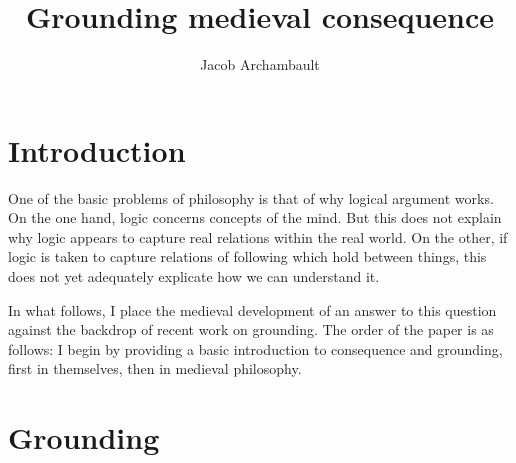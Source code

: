 \documentclass[a4paper,11pt]{article}
\title{Grounding medieval consequence}
\author{Jacob Archambault}
\begin{document}
\maketitle
\tableofcontents

\begin{abstract}
\end{abstract}

\section{Introduction}
One of the basic problems of philosophy is that of why logical argument works. On the one hand, logic concerns concepts of the mind. But this does not explain why logic appears to capture real relations within the real world. On the other, if logic is taken to capture relations of following which hold between things, this does not yet adequately explicate how we can understand it.

In what follows, I place the medieval development of an answer to this question against the backdrop of recent work on grounding. The order of the paper is as follows: I begin by providing a basic introduction to consequence and grounding, first in themselves, then in medieval philosophy. %


\section{Grounding}
\end{document}
